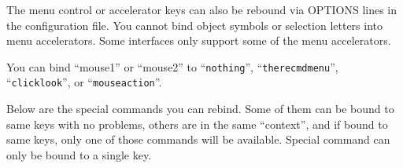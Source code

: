 \item[\tb{Menu accelerator keys}]
The menu control or accelerator keys can also be rebound via OPTIONS lines
in the configuration file.
You cannot bind object symbols or selection letters into menu accelerators.
Some interfaces only support some of the menu accelerators.

\item[\tb{Mouse buttons}]
You can bind ``mouse1'' or ``mouse2'' to ``{\tt nothing}'',
``{\tt therecmdmenu}'', ``{\tt clicklook}'', or ``{\tt mouseaction}''.

\item[\tb{Special command keys}]
Below are the special commands you can rebind. Some of them can be bound to
same keys with no problems, others are in the same ``context'', and if bound
to same keys, only one of those commands will be available. Special command
can only be bound to a single key.
\elist

